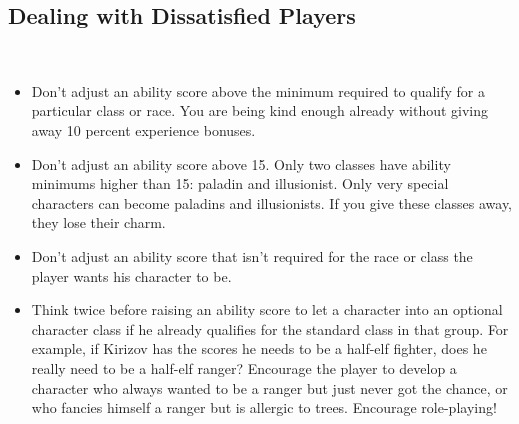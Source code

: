 \documentclass[../TSR-2100-main.tex]{subfiles}
\begin{document}
\begin{multicols}{3}
\subsection*{\textcolor{dndblue}{\textbf{Dealing with Dissatisfied Players}}}
\setlength{\parindent}{8pt}\\
\begin{itemize}
	\item{Don’t adjust an ability score above the minimum required to qualify for a particular class or race. You are being kind enough already without giving away 10 percent experience bonuses.}\\
	\item{Don’t adjust an ability score above 15. Only two classes have ability minimums higher than 15: paladin and illusionist. Only very special characters can become paladins and illusionists. If you give these classes away, they lose their charm.}\\
	\item{Don’t adjust an ability score that isn’t required for the race or class the player wants his character to be.}\\
	\item{Think twice before raising an ability score to let a character into an optional character class if he already qualifies for the standard class in that group. For example, if Kirizov has the scores he needs to be a half-elf fighter, does he really need to be a half-elf ranger? Encourage the player to develop a character who always wanted to be a ranger but just never got the chance, or who fancies himself a ranger but is allergic to trees. Encourage role-playing!}\\
\end{itemize}


\end{multicols}
\end{document}

